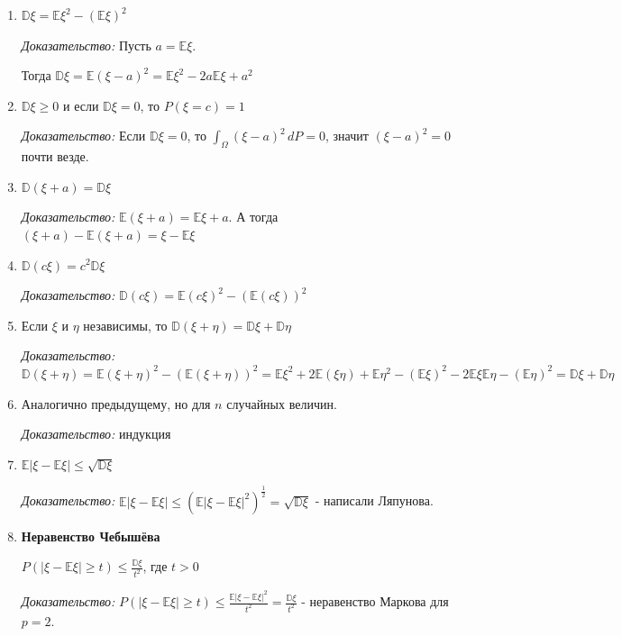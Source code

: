 \begin{properties}
    \begin{enumerate}
        \item {
            $\mathbb{D} \xi = \mathbb{E} \xi^2 - (\mathbb{E} \xi)^2$

            \textit{Доказательство: } Пусть $a = \mathbb{E} \xi$.

            Тогда $\mathbb{D} \xi = \mathbb{E} (\xi - a)^2 = \mathbb{E} \xi^2 - 2a\mathbb{E}\xi + a^2$
        }
        \item {
            $\mathbb{D} \xi \geqslant 0$ и если $\mathbb{D} \xi = 0$, то $P(\xi = c) = 1$

            \textit{Доказательство: } Если $\mathbb{D} \xi = 0$, то
            $\int_{\Omega} (\xi - a)^2 \, dP = 0$, значит $(\xi - a)^2 = 0$ почти везде.
        }
        \item {
            $\mathbb{D} (\xi + a) = \mathbb{D} \xi$

            \textit{Доказательство: } $\mathbb{E} (\xi + a) = \mathbb{E} \xi + a$. А тогда 
            $(\xi + a) - \mathbb{E} (\xi + a) = \xi - \mathbb{E} \xi$
        }
        \item {
            $\mathbb{D} (c \xi) = c^2 \mathbb{D} \xi$

            \textit{Доказательство: } $\mathbb{D} (c\xi) = \mathbb{E} (c\xi)^2 - (\mathbb{E} (c\xi))^2$
        }
        \item {
            Если $\xi$ и $\eta$ независимы, то $\mathbb{D} (\xi + \eta) = \mathbb{D}\xi + \mathbb{D} \eta$

            \textit{Доказательство: } $\mathbb{D} (\xi + \eta) = \mathbb{E} (\xi + \eta)^2 - (\mathbb{E} (\xi + \eta))^2 = 
            \mathbb{E} \xi^2 + 2\mathbb{E}(\xi \eta) + \mathbb{E} \eta^2 - (\mathbb{E}\xi)^2 - 2\mathbb{E}\xi\mathbb{E}\eta - (\mathbb{E}\eta)^2 = \mathbb{D} \xi + \mathbb{D} \eta$
        }
        \item {
            Аналогично предыдущему, но для $n$ случайных величин.

            \textit{Доказательство: } индукция 
        }
        \item {
            $\mathbb{E} |\xi - \mathbb{E} \xi| \leqslant \sqrt{\mathbb{D} \xi}$

            \textit{Доказательство: } $\mathbb{E} |\xi - \mathbb{E} \xi| \leqslant (\mathbb{E}|\xi - \mathbb{E}\xi|^2)^{\frac{1}{2}} = \sqrt{\mathbb{D} \xi}$ - написали Ляпунова. 
        }
        \item {
            \textbf{Неравенство Чебышёва}

            $P(|\xi - \mathbb{E} \xi| \geqslant t) \leqslant \frac{\mathbb{D} \xi}{t^2}$, где $t > 0$

            \textit{Доказательство: } $P(|\xi - \mathbb{E} \xi| \geqslant t) \leqslant \frac{\mathbb{E} |\xi - \mathbb{E} \xi|^2}{t^2} = \frac{\mathbb{D}\xi}{t^2}$ - неравенство Маркова для $p = 2$. 
        }
    \end{enumerate}
\end{properties}

